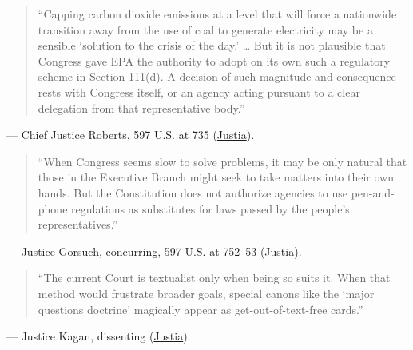 \documentclass[12pt]{article}
\begin{document}
\begin{quote}
``Capping carbon dioxide emissions at a level that will force a nationwide transition away from the use of coal to generate electricity may be a sensible `solution to the crisis of the day.' \dots{} But it is not plausible that Congress gave EPA the authority to adopt on its own such a regulatory scheme in Section 111(d). A decision of such magnitude and consequence rests with Congress itself, or an agency acting pursuant to a clear delegation from that representative body.''
\end{quote}
\noindent --- Chief Justice Roberts, 597 U.S. at 735 (\href{https://supreme.justia.com/cases/federal/us/597/20-1530/}{Justia}).

\begin{quote}
``When Congress seems slow to solve problems, it may be only natural that those in the Executive Branch might seek to take matters into their own hands. But the Constitution does not authorize agencies to use pen-and-phone regulations as substitutes for laws passed by the people's representatives.''
\end{quote}
\noindent --- Justice Gorsuch, concurring, 597 U.S. at 752--53 (\href{https://supreme.justia.com/cases/federal/us/597/20-1530/}{Justia}).

\begin{quote}
``The current Court is textualist only when being so suits it. When that method would frustrate broader goals, special canons like the `major questions doctrine' magically appear as get-out-of-text-free cards.''
\end{quote}
\noindent --- Justice Kagan, dissenting (\href{https://supreme.justia.com/cases/federal/us/597/20-1530/}{Justia}).
\end{document}
